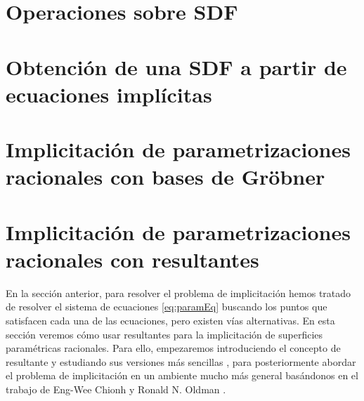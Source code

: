 \section{Operaciones sobre SDF}\label{sec:operaciones}


\section{Obtención de una SDF a partir de ecuaciones implícitas}\label{sec:aprox}


\section{Implicitación de parametrizaciones racionales con bases de Gröbner}


\section{Implicitación de parametrizaciones racionales con resultantes}
En la sección anterior, para resolver el problema de implicitación hemos tratado de resolver el sistema de ecuaciones \eqref{eq:paramEq} buscando los puntos que satisfacen cada una de las ecuaciones, pero existen vías alternativas. En esta sección veremos cómo usar resultantes para la implicitación de superficies paramétricas racionales. Para ello, empezaremos introduciendo el concepto de resultante y estudiando sus versiones más sencillas \cite{ideals_varieties}, para posteriormente abordar el problema de implicitación en un ambiente mucho más general basándonos en el trabajo de Eng-Wee Chionh y Ronald N. Oldman \cite{res1}.





